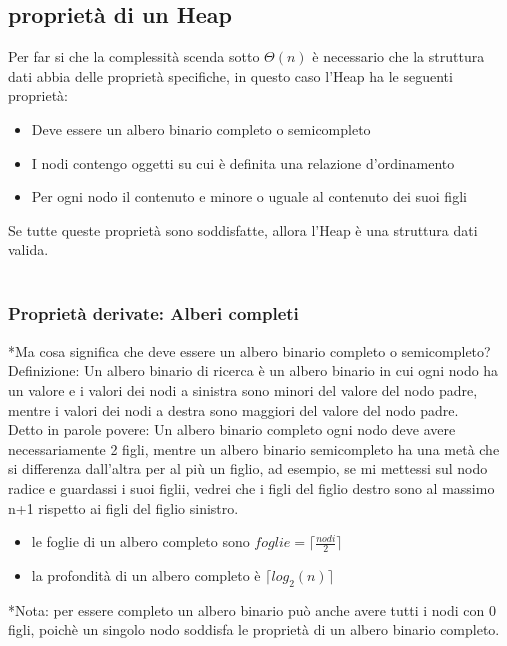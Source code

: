 \documentclass[a4paper,12pt]{article}
\begin{document}
                    \subsection{proprietà di un Heap}
                    Per far si che la complessità scenda sotto $\Theta(n)$ è necessario che la struttura dati abbia delle proprietà specifiche, in questo caso l'Heap ha le seguenti proprietà:
                    \begin{itemize}
                        \item Deve essere un albero binario completo o semicompleto
                        \item I nodi contengo oggetti su cui è definita una relazione d'ordinamento
                        \item Per ogni nodo il contenuto e minore o uguale al contenuto dei suoi figli
                    \end{itemize}
                    Se tutte queste proprietà sono soddisfatte, allora l'Heap è una struttura dati valida. \\ \\
                    
                    \subsubsection{Proprietà derivate: Alberi completi}
                    *Ma cosa significa che deve essere un albero binario completo o semicompleto? \\
                    \textcolor{teorema}{Definizione}: Un albero binario di ricerca è un albero binario in cui ogni nodo ha un valore e i valori dei nodi a sinistra sono minori del valore del nodo padre, mentre i valori dei nodi a destra sono maggiori del valore del nodo padre. \\
                    Detto in parole povere: Un albero binario completo ogni nodo deve avere necessariamente 2 figli, mentre un albero binario semicompleto ha una metà che si differenza  dall'altra per al più un figlio, ad esempio, se mi mettessi sul nodo radice e guardassi i suoi figlii, vedrei che i figli del figlio destro sono al massimo n+1 rispetto ai figli del figlio sinistro. 
                    \begin{itemize}
                        \item le foglie di un albero completo sono $foglie = \lceil\frac{nodi}{2}\rceil$
                        \item la profondità di un albero completo è $\lceil log_{2}(n) \rceil$
                    \end{itemize}
                    *Nota: per essere completo un albero binario può anche avere tutti i nodi con 0 figli, poichè un  singolo nodo soddisfa le proprietà di un albero binario completo. \\
                    
\end{document}
